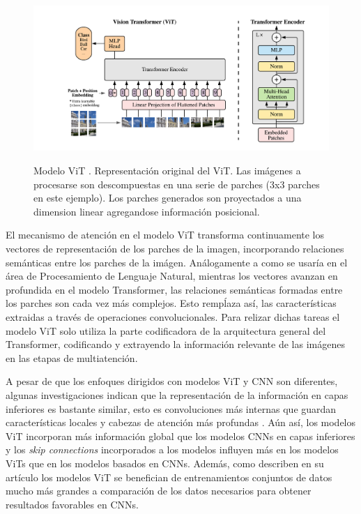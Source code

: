 {\begin{figure}[htp]
    \centering
    {\includegraphics[width=1.0\textwidth]{Chapters/4. ViT-Lung/images/ViT.png}}
\caption{Modelo ViT \cite{DBLP:journals/corr/abs-2010-11929}. Representación original del ViT. Las
imágenes a procesarse son descompuestas en una serie de parches (3x3 parches en este ejemplo). Los
parches generados son proyectados a una dimension linear agregandose información posicional.}
\label{fig_ViT}
\end{figure}

El mecanismo de atención en el modelo ViT transforma continuamente los vectores de representación de
los parches de la imagen, incorporando relaciones semánticas entre los parches de la imágen.
Análogamente a como se usaría en el área de Procesamiento de Lenguaje Natural, mientras los vectores
avanzan en profundida en el modelo Transformer, las relaciones semánticas formadas entre los parches
son cada vez más complejos. Esto rempĺaza así, las características extraidas a través de operaciones
convolucionales. Para relizar dichas tareas el modelo ViT solo utiliza la parte codificadora de la
arquitectura general del Transformer, codificando y extrayendo la información relevante de las imágenes
en las etapas de multiatención.

A pesar de que los enfoques dirigidos con modelos ViT y CNN son diferentes, algunas investigaciones
indican que la representación de la información en capas inferiores es bastante similar, esto es
convoluciones más internas que guardan características locales y cabezas de atención más profundas
\cite{DBLP:journals/corr/abs-2108-08810}. Aún así, los modelos ViT incorporan más información global
que los modelos CNNs en capas inferiores y los \textit{skip connections} incorporados a los modelos
influyen más en los modelos ViTs
que en los modelos basados en CNNs. Además, como describen en su artículo \citeauthor{DBLP:journals/corr/abs-2010-11929}
los modelos ViT se benefician de entrenamientos conjuntos de datos mucho más grandes a comparación
de los datos necesarios para obtener resultados favorables en CNNs.

}
